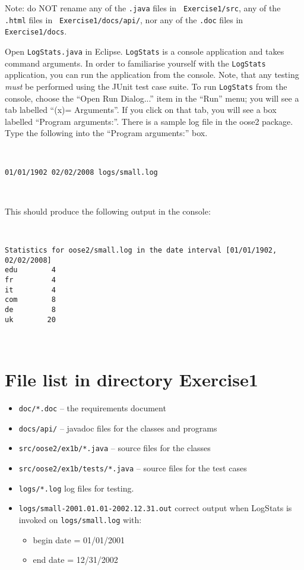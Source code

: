 \documentclass[12pt,a4paper]{article}
\begin{document}
Note: do NOT rename any of the {\tt .java} files in {\tt
  Exercise1/src}, any of the {\tt .html} files in {\tt
  Exercise1/docs/api/}, nor any of the {\tt .doc} files in
{\tt Exercise1/docs}.

Open \lstinline!LogStats.java! in Eclipse.  \lstinline!LogStats! is a
console application and takes command arguments.  In order to
familiarise yourself with the \lstinline!LogStats! application, you
can run the application from the console.  Note, that any testing {\em
  must} be performed using the JUnit test case suite.  To run
\lstinline!LogStats! from the console, choose the ``Open Run
Dialog...''  item in the ``Run'' menu; you will see a tab labelled
``(x)= Arguments''.  If you click on that tab, you will see a box
labelled ``Program arguments:''.  There is a sample log file in the
oose2 package.  Type the following into the ``Program arguments:''
box.

\

\begin{verbatim}
01/01/1902 02/02/2008 logs/small.log

\end{verbatim}

\
 
This should produce the following output in the console:

\

\begin{verbatim}
Statistics for oose2/small.log in the date interval [01/01/1902, 02/02/2008]
edu        4
fr         4
it         4
com        8
de         8
uk        20
\end{verbatim}

\

\section{File list in directory Exercise1}
\begin{itemize}
\item {\tt doc/*.doc} – the requirements document
\item {\tt docs/api/} – javadoc files for the classes and
  programs
\item {\tt src/oose2/ex1b/*.java} – source files for the
  classes
\item {\tt src/oose2/ex1b/tests/*.java} – source files for
  the test cases
\item {\tt logs/*.log} log files for testing.
\item {\tt logs/small-2001.01.01-2002.12.31.out} correct output when
  LogStats is invoked on {\tt logs/small.log} with:
  \begin{itemize}
  \item begin date = 01/01/2001
  \item end date = 12/31/2002
  \end{itemize}
\end{itemize}
\end{document}
